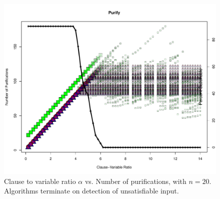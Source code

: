 \begin{figure}[htdp]

\begin{center}

\includegraphics[width=1.1\textwidth]{./figures/metricOutput_n20-earlyExit/purifyCount.pdf}

\caption{Clause to variable ratio $\alpha$ vs. Number of purifications, with $n = 20$.  Algorithms terminate on detection of unsatisfiable input. }
\label{purifyFig_10}
\end{center}
\end{figure}

\FloatBarrier


